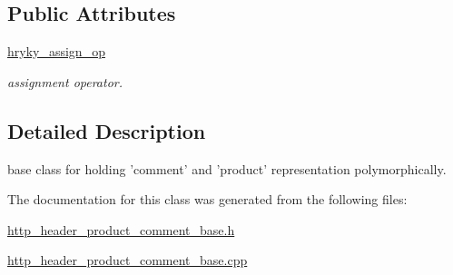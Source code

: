 \subsection*{Public Attributes}
\begin{DoxyCompactItemize}
\item 
\hypertarget{classhryky_1_1http_1_1header_1_1product__comment_1_1_base_a1b2480a1805e2adc028244ee51817834}{\hyperlink{classhryky_1_1http_1_1header_1_1product__comment_1_1_base_a1b2480a1805e2adc028244ee51817834}{hryky\-\_\-assign\-\_\-op}}\label{classhryky_1_1http_1_1header_1_1product__comment_1_1_base_a1b2480a1805e2adc028244ee51817834}

\begin{DoxyCompactList}\small\item\em assignment operator. \end{DoxyCompactList}\end{DoxyCompactItemize}


\subsection{Detailed Description}
base class for holding 'comment' and 'product' representation polymorphically. 

The documentation for this class was generated from the following files\-:\begin{DoxyCompactItemize}
\item 
\hyperlink{http__header__product__comment__base_8h}{http\-\_\-header\-\_\-product\-\_\-comment\-\_\-base.\-h}\item 
\hyperlink{http__header__product__comment__base_8cpp}{http\-\_\-header\-\_\-product\-\_\-comment\-\_\-base.\-cpp}\end{DoxyCompactItemize}
